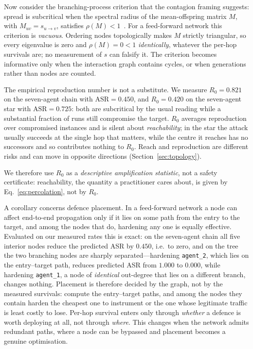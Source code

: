 \documentclass[sigconf,anonymous]{aamas}
\begin{document}
Now consider the branching-process criterion that the contagion framing suggests:
spread is subcritical when the spectral radius of the mean-offspring matrix $M$,
with $M_{uv} = s_{u\to v}$, satisfies $\rho(M) < 1$~\cite{PastorSatorras2001}. For
a feed-forward network this criterion is \emph{vacuous}. Ordering nodes
topologically makes $M$ strictly triangular, so every eigenvalue is zero and
$\rho(M) = 0 < 1$ \emph{identically}, whatever the per-hop survivals are; no
measurement of $s$ can falsify it. The criterion becomes informative only when the
interaction graph contains cycles, or when generations rather than nodes are
counted.

The empirical reproduction number is not a substitute. We measure $R_0 = 0.821$
on the seven-agent chain with $\mathrm{ASR} = 0.450$, and $R_0 = 0.420$ on the
seven-agent star with $\mathrm{ASR} = 0.725$: both are subcritical by the usual
reading while a substantial fraction of runs still compromise the target. $R_0$
averages reproduction over compromised instances and is silent about
\emph{reachability}; in the star the attack usually succeeds at the single hop
that matters, while the centre it reaches has no successors and so contributes
nothing to $R_0$. Reach and reproduction are different risks and can move in
opposite directions (Section~\ref{sec:topology}).

We therefore use $R_0$ as a \emph{descriptive amplification statistic}, not a safety
certificate: reachability, the quantity a practitioner cares about, is given by
Eq.~\eqref{eq:percolation}, not by $R_0$.

A corollary concerns defence placement. In a feed-forward network a node can
affect end-to-end propagation only if it lies on some path from the entry to the
target, and among the nodes that do, hardening any one is equally effective.
Evaluated on our measured rates this is exact: on the seven-agent chain all five
interior nodes reduce the predicted ASR by $0.450$, i.e.\ to zero, and on the tree
the two branching nodes are sharply separated---hardening
\texttt{agent\_2}, which lies on the entry--target path, reduces predicted ASR from
$1.000$ to $0.000$, while hardening \texttt{agent\_1}, a node of \emph{identical}
out-degree that lies on a different branch, changes nothing. Placement is therefore
decided by the graph, not by the measured survivals: compute the entry--target
paths, and among the nodes they contain harden the cheapest one to instrument or
the one whose legitimate traffic is least costly to lose. Per-hop survival enters
only through \emph{whether} a defence is worth deploying at all, not through
\emph{where}. This changes when the network admits redundant paths, where a node
can be bypassed and placement becomes a genuine optimisation.
\end{document}
